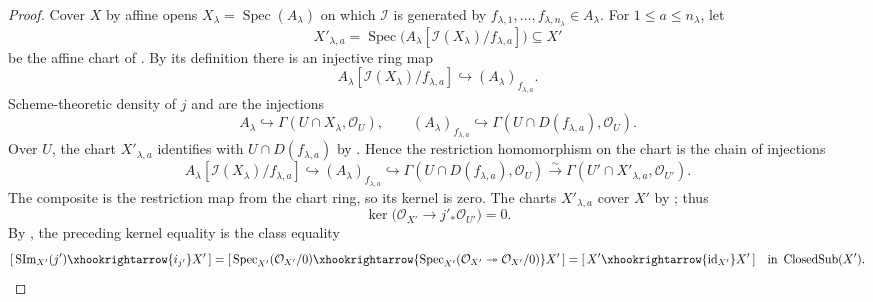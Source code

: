 \begin{proof}
  Cover $X$ by affine opens $X_\lambda=\operatorname{Spec}(A_\lambda)$ on
  which $\mathcal I$ is generated by
  $f_{\lambda,1},\ldots,f_{\lambda,n_\lambda}\in A_\lambda$.
  For $1\leq a\leq n_\lambda$, let
  \[
    X'_{\lambda,a}
      =\operatorname{Spec}
        \bigl(A_\lambda[\mathcal I(X_\lambda)/f_{\lambda,a}]\bigr)
      \subseteq X'
  \]
  be the affine chart of .
  By its definition there is an injective ring map
  \[
    A_\lambda[\mathcal I(X_\lambda)/f_{\lambda,a}]
      \hookrightarrow (A_\lambda)_{f_{\lambda,a}}.
  \]
  Scheme-theoretic density of $j$ and
   are the injections
  \[
    A_\lambda\hookrightarrow
      \Gamma(U\cap X_\lambda,\mathcal O_U),
    \qquad
    (A_\lambda)_{f_{\lambda,a}}\hookrightarrow
      \Gamma(U\cap D(f_{\lambda,a}),\mathcal O_U).
  \]
  Over $U$, the chart $X'_{\lambda,a}$ identifies with
  $U\cap D(f_{\lambda,a})$ by
  .  Hence the restriction
  homomorphism on the chart is the chain of injections
  \[
    A_\lambda[\mathcal I(X_\lambda)/f_{\lambda,a}]
      \hookrightarrow(A_\lambda)_{f_{\lambda,a}}
      \hookrightarrow
      \Gamma(U\cap D(f_{\lambda,a}),\mathcal O_U)
      \xrightarrow{\sim}
      \Gamma(U'\cap X'_{\lambda,a},\mathcal O_{U'}).
  \]
  The composite is the restriction map from the chart ring, so its kernel is
  zero.
  The charts $X'_{\lambda,a}$ cover $X'$ by
  ; thus
  \[
    \ker\bigl(\mathcal O_{X'}\to j'_*\mathcal O_{U'}\bigr)=0.
  \]
  By , the preceding kernel
  equality is the class equality
  \[
    [\,\operatorname{SIm}_{X'}(j')\xhookrightarrow{i_{j'}}X'\,]
      =[\,\operatorname{Spec}_{X'}(\mathcal O_{X'}/0)
        \xhookrightarrow{\operatorname{Spec}_{X'}
          (\mathcal O_{X'}\twoheadrightarrow\mathcal O_{X'}/0)}X'\,]
      =[\,X'\xhookrightarrow{\operatorname{id}_{X'}}X'\,]
      \quad\text{in }\operatorname{ClosedSub}(X').
  \]
\end{proof}

